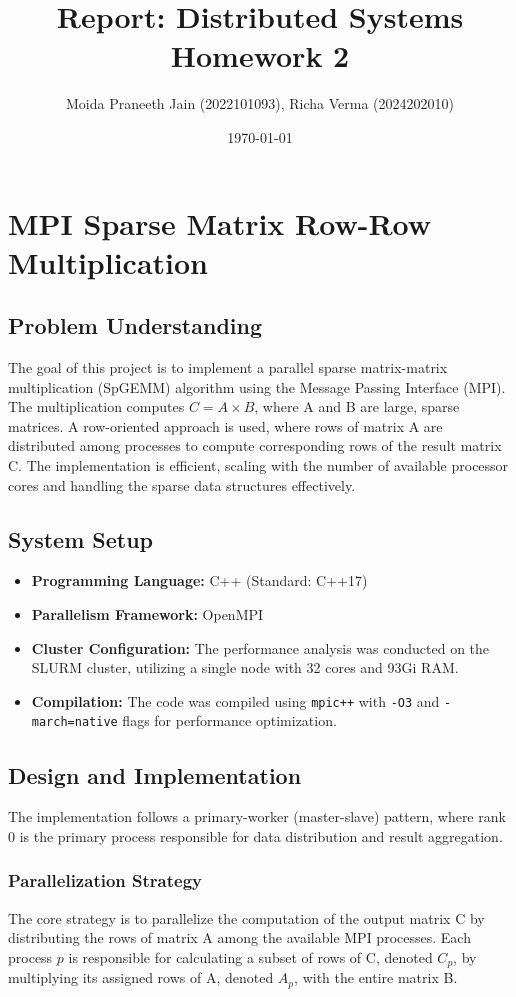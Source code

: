 \documentclass{article}
\title{Report: Distributed Systems Homework 2}
\author{Moida Praneeth Jain (2022101093), Richa Verma (2024202010)}
\date{\today}
\begin{document}
\maketitle

\section{MPI Sparse Matrix Row-Row Multiplication}

\subsection{Problem Understanding}
The goal of this project is to implement a parallel sparse matrix-matrix multiplication (SpGEMM) algorithm using the Message Passing Interface (MPI). The multiplication computes $C = A \times B$, where A and B are large, sparse matrices. A row-oriented approach is used, where rows of matrix A are distributed among processes to compute corresponding rows of the result matrix C. The implementation is efficient, scaling with the number of available processor cores and handling the sparse data structures effectively.

\subsection{System Setup}
\begin{itemize}
    \item \textbf{Programming Language:} C++ (Standard: C++17)
    \item \textbf{Parallelism Framework:} OpenMPI
    \item \textbf{Cluster Configuration:} The performance analysis was conducted on the SLURM cluster, utilizing a single node with 32 cores and 93Gi RAM.
    \item \textbf{Compilation:} The code was compiled using \texttt{mpic++} with \texttt{-O3} and \texttt{-march=native} flags for performance optimization.
\end{itemize}

\subsection{Design and Implementation}
The implementation follows a primary-worker (master-slave) pattern, where rank 0 is the primary process responsible for data distribution and result aggregation.

\subsubsection{Parallelization Strategy}
The core strategy is to parallelize the computation of the output matrix C by distributing the rows of matrix A among the available MPI processes. Each process $p$ is responsible for calculating a subset of rows of C, denoted $C_p$, by multiplying its assigned rows of A, denoted $A_p$, with the entire matrix B.
\end{document}
